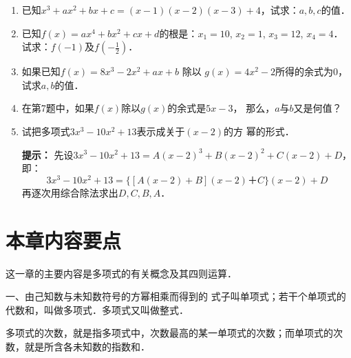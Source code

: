 \begin{enumerate}
\begin{enumerate}
           \item $f(x)=\poly{5,4,-12},g(x)=x+2$；
           \item $f(x)=x^8-1,g(x)=x+1$；
           \item $f(x)=\poly{4,6,-8,-10},g(x)=2x-1$；
           \item $f(x)=\poly{3,-11,8,-3},g(x)=3x+2$；
           \item $f(x)=\poly{3,a,a^2,-2a^3},g(x)=3x-2a$；
           \item $f(x)=\poly{4,5b,9b^2,6b^3,4},g(x)=4x+b$．%
           \item $f(x)=\poly{3,-5,-4,3,-2},g(x)=x-2$；%
           \item $f(x)=\poly{1,1,-3,4,-5,-6},g(x)=x-1$
           \item $f(x)=\poly{2,1,-3,7,-5},g(x)=x-4$；
           \item $f(x)=x^2+6x^3-29x+21,g(x)=3x-2$；
\end{enumerate}

\item 已知$x^3+ax^2+bx+c=(x-1)(x-2)(x-3)+4$，试求：$a,b,c$的值．
\item 已知$f(x)=ax^4+bx^2+cx+d$的根是：$x_1=10$, $x_2=1$,
$x_3=12$, $x_4=4$．试求：$f(-1)$及$f\left(-\frac{1}{2}\right)$．
\item 如果已知$f(x)=8x^3-2x^2+ax+b$ 除以
$g(x)=4x^2-2$所得的余式为0，试求$a,b$的值．
\item 在第7题中，如果$f(x)$除以$g(x)$的余式是$5x-3$，
那么，$a$与$b$又是何值？
\item 试把多项式$3x^3-10x^2+13$表示成关于$(x-2)$的方
幂的形式．

\textbf{提示：} 先设$3x^3-10x^2+13=A(x-2)^3+B(x-2)^2
+C (x-2) +D$，即：
\[3x^3-10x^2+13=\{[A(x-2)+B](x-2)
＋C\} (x-2)+D\]
再逐次用综合除法求出$D, C, B, A$．
\end{enumerate}



\section*{本章内容要点}

这一章的主要内容是多项式的有关概念及其四则运算．

一、由己知数与未知数符号的方幂相乘而得到的
式子叫单项式；若干个单项式的代数和，叫做多项式．多项式又叫做整式．

多项式的次数，就是指多项式中，次数最高的某一单项式的次数；而单项式的次数，就是所含各未知数的指数和．

